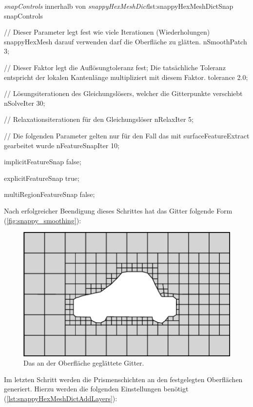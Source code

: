 \begin{dict}{\textit{snapControls} innerhalb von \textit{snappyHexMeshDict}}{lst:snappyHexMeshDictSnap}
snapControls
{
	// Dieser Parameter legt fest wie viele Iterationen (Wiederholungen) snappyHexMesh darauf verwenden darf die Oberfläche zu glätten.
    nSmoothPatch 3;

	// Dieser Faktor legt die Auflösungtoleranz fest; Die tatsächliche Toleranz entspricht der lokalen Kantenlänge multipliziert mit diesem Faktor. 
    tolerance 2.0;

	// Lösungsiterationen des Gleichungslösers, welcher die Gitterpunkte verschiebt
    nSolveIter 30;

	// Relaxationsiterationen für den Gleichungslöser	
    nRelaxIter 5;

	// Die folgenden Parameter gelten nur für den Fall das mit surfaceFeatureExtract gearbeitet wurde
    nFeatureSnapIter 10;

    implicitFeatureSnap false;

    explicitFeatureSnap true;

    multiRegionFeatureSnap false;
}
\end{dict}

Nach erfolgreicher Beendigung dieses Schrittes hat das Gitter folgende Form (\autoref{fig:snappy_smoothing}):
\begin{figure}
\centering
\includegraphics[width=0.7\linewidth]{Abbildungen/snappy_smoothing}
\caption[geglättetes Gitter mit snappyHexMesh]{Das an der Oberfläche geglättete Gitter.}
\label{fig:snappy_smoothing}
\end{figure}

Im letzten Schritt werden die Prismenschichten an den festgelegten Oberflächen generiert. Hierzu werden die folgenden Einstellungen benötigt (\autoref{lst:snappyHexMeshDictAddLayers}):

